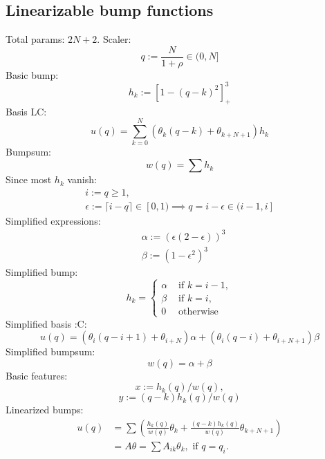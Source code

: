 \documentclass[12pt]{article}
\begin{document}
\subsection{Linearizable bump functions}
Total params: $2N+2$.
Scaler:
\begin{equation}
    q := \frac{N}{1+\rho} \in (0,N]
\end{equation}
Basic bump:
\begin{equation}
    h_k := [1-(q-k)^2]^3_+
\end{equation}
Basis LC:
\begin{equation}
    u(q) = \sum_{k=0}^N(\theta_k (q-k) + \theta_{k+N+1})h_k
\end{equation}
Bumpsum:
\begin{equation}
    w(q) = \sum h_k
\end{equation}
Since most $h_k$ vanish:
\begin{equation}
    \begin{split}
        i := q \geq 1, \\
        \epsilon := \lceil i-q \rceil \in [0,1) \implies q = i - \epsilon \in (i-1,i]
    \end{split}
\end{equation}
Simplified expressions:
\begin{equation}
    \begin{split}
        & \alpha := (\epsilon(2-\epsilon))^3 \\
        & \beta := (1-\epsilon^2)^3
    \end{split}
\end{equation}
Simplified bump:
\begin{equation}
    h_k = 
    \begin{cases}
        \alpha & \text{ if }k=i-1, \\
        \beta & \text{ if }k=i, \\
        0 & \text{ otherwise }
    \end{cases}
\end{equation}
Simplified basis :C:
\begin{equation}
    u(q) = (\theta_i(q-i+1) + \theta_{i+N})\alpha + (\theta_i(q-i) + \theta_{i+N+1})\beta
\end{equation}
Simplified bumpsum:
\begin{equation}
    w(q) = \alpha + \beta
\end{equation}
Basic features:
\begin{equation}
    x := h_k(q)/w(q),
\end{equation}
\begin{equation}
    y := (q-k)h_k(q)/w(q)
\end{equation}
Linearized bumps:
\begin{equation}
    \begin{split}
        u(q) & = \sum \left(\frac{h_k(q)}{w(q)}\theta_k + \frac{(q-k)h_k(q)}{w(q)}\theta_{k+N+1}\right) \\
        & = A\theta = \sum A_{ik}\theta_k, \text{ if }q=q_i.
    \end{split}
\end{equation}
\end{document}
